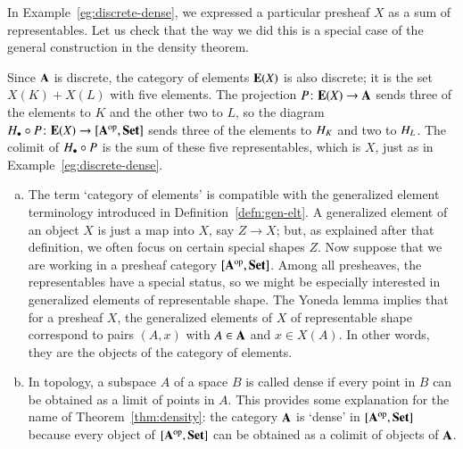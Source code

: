 \begin{example}
In Example~\ref{eg:discrete-dense}, we expressed a particular presheaf $X$
as a sum of representables.  Let us check that the way we did this is a
special case of the general construction in the density theorem.

Since $\mathbf{A}$ is discrete, the category of elements $\mathbf{E}(X)$ is also
discrete; it is the set $X(K) + X(L)$ with five elements.  The projection
$P\from \elt{X} \to \scat{A}$ sends three of the elements to $K$ and the
other two to $L$, so the diagram $\h_\bl \of P\from \elt{X} \to
\pshf{\scat{A}}$ sends three of the elements to $H_K$ and two to $H_L$.
The colimit of $H_\bullet \mathbin{\circ} P$ is the sum of these five representables,
which is $X$, just as in Example~\ref{eg:discrete-dense}.
\end{example}

\begin{remarks}
\begin{enumerate}[(b)]
\item 
The term `category of elements'%
%
%
%
is compatible with the generalized%
%
%
element terminology introduced in Definition~\ref{defn:gen-elt}.  A
generalized element of an object $X$ is just a map into $X$, say $Z \to X$;
but, as explained after that definition, we often focus on certain special
shapes $Z$.  Now suppose that we are working in a presheaf category
$[\mathbf{A}^{\mathrm{op}},\mathbf{Set}]$.  Among all presheaves, the representables have a special
status, so we might be especially interested in generalized elements of
representable shape.  The Yoneda lemma implies that for a presheaf $X$, the
generalized elements of $X$ of representable shape correspond to pairs $(A,
x)$ with $A \in \mathbf{A}$ and $x \in X(A)$.  In other words, they are the
objects of the category of elements.

\item 
In topology, a subspace $A$ of a space $B$ is called dense%
%
%
if every point in $B$ can be obtained as a limit of points in $A$.  This
provides some explanation for the name of Theorem~\ref{thm:density}: the
category $\mathbf{A}$ is `dense' in $[\mathbf{A}^{\mathrm{op}},\mathbf{Set}]$ because every object of
$[\mathbf{A}^{\mathrm{op}},\mathbf{Set}]$ can be obtained as a colimit of objects of $\mathbf{A}$.
%
%
%
%
\end{enumerate}
\end{remarks}


